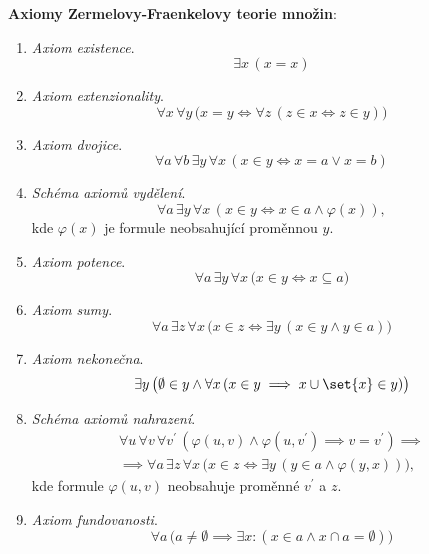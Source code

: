 \noindent\textbf{Axiomy Zermelovy-Fraenkelovy teorie množin}:
\begin{enumerate}[label=({ZF}\arabic*)]
    \item\label{item:axiom_existence} \emph{Axiom existence}.
    \begin{equation*}
        \exists x\,(x=x)
    \end{equation*}
    \item\label{item:axiom_extenzionality} \emph{Axiom extenzionality}.
    \begin{equation*}
        \forall x\,\forall y\,\bigl(x=y \iff \forall z\,(z\in x \iff z\in y)\bigr)
    \end{equation*}
    \item\label{item:axiom_dvojice} \emph{Axiom dvojice}.
    \begin{equation*}
        \forall a\,\forall b\,\exists y\,\forall x\,(x \in y \iff x=a \lor x=b)
    \end{equation*}
    \item\label{item:schema_axiomu_vydeleni} \emph{Schéma axiomů vydělení}.
    \begin{equation*}
        \forall a\,\exists y\,\forall x\,(x\in y \iff x\in a \land \varphi(x)),
    \end{equation*}
    kde $\varphi(x)$ je formule neobsahující proměnnou $y$.
    \item\label{item:axiom_potence} \emph{Axiom potence}.
    \begin{equation*}
        \forall a\,\exists y\,\forall x\,\bigl(x\in y \iff x\subseteq a\bigr)
    \end{equation*}
    \item\label{item:axiom_sumy} \emph{Axiom sumy}.
    \begin{equation*}
        \forall a\,\exists z\,\forall x\,\bigl(x\in z\iff \exists y\,(x\in y \land y\in a)\bigr)
    \end{equation*}
    \item\label{item:axiom_nekonecna} \emph{Axiom nekonečna}.
    \begin{equation*}
        \exists y\,\bigl(\emptyset\in y \land \forall x\,(x\in y\implies x\cup\set{x}\in y)\bigr)
    \end{equation*}
    \item\label{item:schema_axiomu_nahrazeni} \emph{Schéma axiomů nahrazení}.
    \begin{align*}
        \forall u\,\forall v\,\forall v^\prime\,(\varphi(u,v) \land \varphi(u,v^\prime) \implies v=v^\prime)\implies\\ \implies \forall a\,\exists z\,\forall x\,\bigl(x\in z \iff \exists y\,(y\in a \land \varphi(y,x))\bigr),
    \end{align*}
    kde formule $\varphi(u,v)$ neobsahuje proměnné $v^\prime$ a $z$.
    \item\label{item:axiom_fundovanosti} \emph{Axiom fundovanosti}.
    \begin{equation*}
        \forall a\,\bigl(a\neq\emptyset \implies \exists x:(x\in a \land x\cap a=\emptyset)\bigr)
    \end{equation*}
\end{enumerate}
